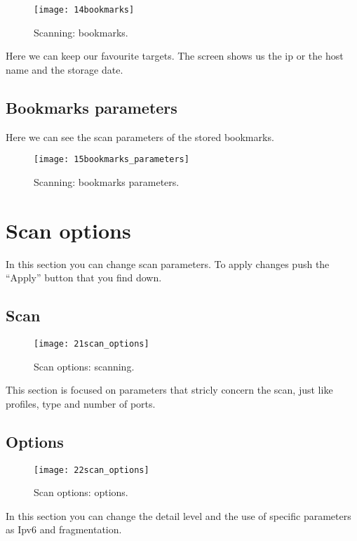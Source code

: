 \begin{figure}[h]
  \centering
  \texttt{[image: 14bookmarks]}
  \caption{Scanning: bookmarks.}
  \label{fig:ContentsScanBookmarks}
\end{figure}
Here we can keep our favourite targets. The screen shows us the ip or the host 
name and the storage date.

\subsection{Bookmarks parameters}
\label{sec:ContentsScanBookmarksParameters}

Here we can see the scan parameters of the stored bookmarks.
\begin{figure}[h]
  \centering
  \texttt{[image: 15bookmarks\_parameters]}
  \caption{Scanning: bookmarks parameters.}
  \label{fig:ContentsScanBookmarksParameters}
\end{figure}


\section{Scan options}
\label{sec:ContentsScanOptions}

In this section you can change scan parameters. To apply changes push the 
``Apply'' button that you find down.

\subsection{Scan}
\label{sec:ContentsScanOptionsScanParameters}

\begin{figure}[h]
  \centering
  \texttt{[image: 21scan\_options]}
  \caption{Scan options: scanning.}
  \label{fig:ContentsScanOptionsScanParameters}
\end{figure}
This section is focused on parameters that stricly concern the scan, just like
profiles, type and number of ports.

\subsection{Options}
\label{sec:ContentsScanOptionsScanParamOptions}

\begin{figure}[h]
  \centering
  \texttt{[image: 22scan\_options]}
  \caption{Scan options: options.}
  \label{fig:ContentsScanOptionsScanParamOptions}
\end{figure}
In this section you can change the detail level and the use of specific
parameters as Ipv6 and fragmentation.

